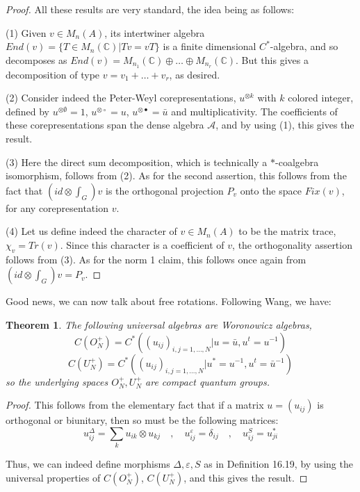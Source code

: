 \documentclass[12pt]{amsbook}
\newtheorem{theorem}{Theorem}[chapter]
\begin{document}
\begin{proof}
All these results are very standard, the idea being as follows:

\medskip

(1) Given $v\in M_n(A)$, its intertwiner algebra $End(v)=\{T\in M_n(\mathbb C)|Tv=vT\}$ is a finite dimensional $C^*$-algebra, and so decomposes as $End(v)=M_{n_1}(\mathbb C)\oplus\ldots\oplus M_{n_r}(\mathbb C)$. But this gives a decomposition of type $v=v_1+\ldots+v_r$, as desired.

\medskip

(2) Consider indeed the Peter-Weyl corepresentations, $u^{\otimes k}$ with $k$ colored integer, defined by $u^{\otimes\emptyset}=1$, $u^{\otimes\circ}=u$, $u^{\otimes\bullet}=\bar{u}$ and multiplicativity. The coefficients of these corepresentations span the dense algebra $\mathcal A$, and by using (1), this gives the result.

\medskip

(3) Here the direct sum decomposition, which is technically a $*$-coalgebra isomorphism, follows from (2). As for the second assertion, this follows from the fact that $(id\otimes\int_G)v$ is the orthogonal projection $P_v$ onto the space $Fix(v)$, for any corepresentation $v$.

\medskip

(4) Let us define indeed the character of $v\in M_n(A)$ to be the matrix trace, $\chi_v=Tr(v)$. Since this character is a coefficient of $v$, the orthogonality assertion follows from (3). As for the norm 1 claim, this follows once again from $(id\otimes\int_G)v=P_v$. 
\end{proof}

Good news, we can now talk about free rotations. Following Wang, we have:

\begin{theorem}
The following universal algebras are Woronowicz algebras,
$$C(O_N^+)=C^*\left((u_{ij})_{i,j=1,\ldots,N}\Big|u=\bar{u},u^t=u^{-1}\right)$$
$$C(U_N^+)=C^*\left((u_{ij})_{i,j=1,\ldots,N}\Big|u^*=u^{-1},u^t=\bar{u}^{-1}\right)$$
so the underlying spaces $O_N^+,U_N^+$ are compact quantum groups.
\end{theorem}

\begin{proof}
This follows from the elementary fact that if a matrix $u=(u_{ij})$ is orthogonal or biunitary, then so must be the following matrices:
$$u^\Delta_{ij}=\sum_ku_{ik}\otimes u_{kj}\quad,\quad 
u^\varepsilon_{ij}=\delta_{ij}\quad,\quad
u^S_{ij}=u_{ji}^*$$

Thus, we can indeed define morphisms $\Delta,\varepsilon,S$ as in Definition 16.19, by using the universal properties of $C(O_N^+)$, $C(U_N^+)$, and this gives the result.
\end{proof}
\end{document}
